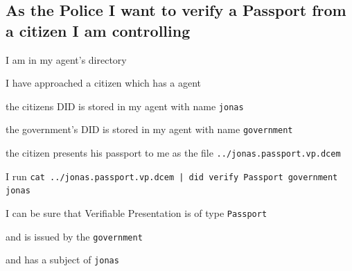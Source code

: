 \subsection{As the Police I want to verify a Passport from a citizen I am controlling}
\begin{description}[1.35cm]
    \item[Given] I am in my agent's directory
    \item[and] I have approached a citizen which has a agent
    \item[and] the citizens DID is stored in my agent with name \texttt{jonas}
    \item[and] the government's DID is stored in my agent with name \texttt{government}
    \item[and] the citizen presents his passport to me as the file \texttt{../jonas.passport.vp.dcem}
    \item[When] I run \texttt{cat ../jonas.passport.vp.dcem | did verify Passport government jonas}
    \item[Then] I can be sure that Verifiable Presentation is of type \texttt{Passport}
    \item[and] and is issued by the \texttt{government}
    \item[and] and has a subject of \texttt{jonas}
\end{description}

